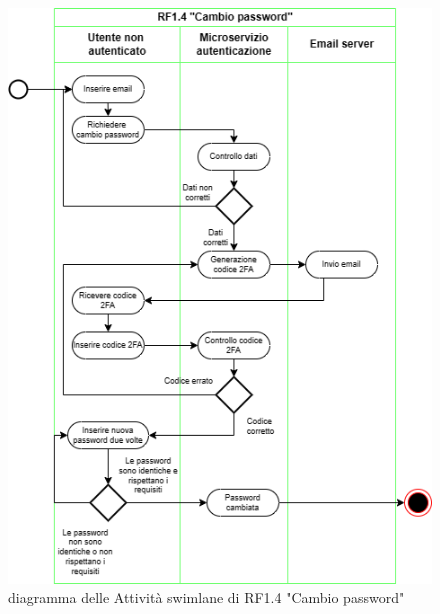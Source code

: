 \documentclass{report}
\begin{document}
\begin{figure}[H]
	\centering\includegraphics[width=1\textwidth]{images/password_change_swimlane.drawio.png}
	diagramma delle Attività swimlane di RF1.4 "Cambio password"
\end{figure}
\end{document}
